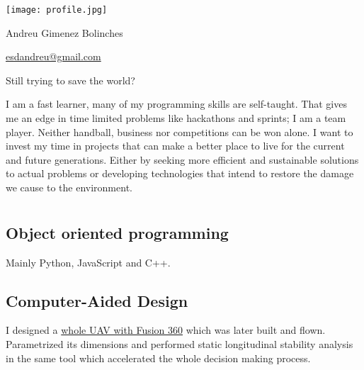 \documentclass[]{infinity-cv}
\begin{document}
\begingroup
\hypersetup{ hidelinks, pdfnewwindow}
\begin{minipage}{0.15\textwidth} %
    \texttt{[image: profile.jpg]}
\end{minipage}
\hfill
\begin{minipage}{0.6\textwidth}
    \centering
    {\Huge\color{heading}Andreu Gimenez Bolinches}
    
    \medskip
    
    \hfill
    \href{mailto:esdandreu@gmail.com}{
        \faEnvelope\hspace{1pt} esdandreu@gmail.com
    } \hfill
    \href{https://www.linkedin.com/in/andreu-gimenez-bolinches-esdandreu/}{
        \faLinkedin
    } \hfill
    \href{https://esdandreu.github.io/}{\faGlobe} \hfill
    \href{https://stackoverflow.com/users/13180090/andreu-gimenez}{
        \faStackOverflow
    } \hfill
    \href{https://github.com/esdandreu}{\faGithub} \hfill
    \href{https://gitlab.com/esdandreu}{\faGitlab} \hfill
    
    \medskip
    Still trying to save the world?
\end{minipage}
\hfill
\begin{minipage}{0.15\textwidth}
\end{minipage}
\medskip
\endgroup

\medskip
I am a fast learner, many of my programming skills are self-taught. That gives
me an edge in time limited problems like hackathons and sprints; I am a team
player. Neither handball, business nor competitions can be won alone. I want to
invest my time in projects that can make a better place to live for the current
and future generations. Either by seeking more efficient and sustainable
solutions to actual problems or developing technologies that intend to restore
the damage we cause to the environment.

\section{\faWrench}
\subsection{Object oriented programming}
Mainly Python, JavaScript and C++.
\subsection{Computer-Aided Design}
I designed a
\href{https://1drv.ms/b/s!AqZvnCxLmXx9hL9DSw-Ee4zU6H5Rcw?e=8hDatB}{whole UAV
with Fusion 360} which was later built and flown. Parametrized its dimensions
and performed static longitudinal stability analysis in the same tool which
accelerated the whole decision making process.
\end{document}
